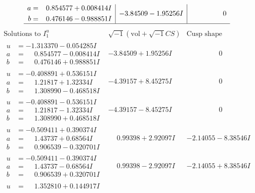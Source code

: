 \documentclass[1p]{elsarticle_modified}
\theoremstyle{definition}
\newcommand{\I}{\sqrt{-1}}
\begin{document}
$$\begin{array}{c|c|c}
\begin{aligned}
a &= \phantom{-}0.854577 + 0.008414 I \\
b &= \phantom{-}0.476146 - 0.988851 I\end{aligned}
 & -3.84509 - 1.95256 I & \phantom{-0.000000 } 0\\
 \hline 
 \end{array}$$\newpage$$\begin{array}{c|c|c}  
\text{Solutions to }I^u_{1}& \I (\text{vol} + \sqrt{-1}CS) & \text{Cusp shape}\\
 \hline 
\begin{aligned}
u &= -1.313370 - 0.054285 I \\
a &= \phantom{-}0.854577 - 0.008414 I \\
b &= \phantom{-}0.476146 + 0.988851 I\end{aligned}
 & -3.84509 + 1.95256 I & \phantom{-0.000000 } 0 \\ \hline\begin{aligned}
u &= -0.408891 + 0.536151 I \\
a &= \phantom{-}1.21817 + 1.32334 I \\
b &= \phantom{-}1.308990 - 0.468518 I\end{aligned}
 & -4.39157 + 8.45275 I & \phantom{-0.000000 } 0 \\ \hline\begin{aligned}
u &= -0.408891 - 0.536151 I \\
a &= \phantom{-}1.21817 - 1.32334 I \\
b &= \phantom{-}1.308990 + 0.468518 I\end{aligned}
 & -4.39157 - 8.45275 I & \phantom{-0.000000 } 0 \\ \hline\begin{aligned}
u &= -0.509411 + 0.390374 I \\
a &= \phantom{-}1.43737 + 0.68564 I \\
b &= \phantom{-}0.906539 - 0.320701 I\end{aligned}
 & \phantom{-}0.99398 + 2.92097 I & -2.14055 - 8.38546 I \\ \hline\begin{aligned}
u &= -0.509411 - 0.390374 I \\
a &= \phantom{-}1.43737 - 0.68564 I \\
b &= \phantom{-}0.906539 + 0.320701 I\end{aligned}
 & \phantom{-}0.99398 - 2.92097 I & -2.14055 + 8.38546 I \\ \hline\begin{aligned}
u &= \phantom{-}1.352810 + 0.144917 I \\

\end{aligned}
\end{array}$$
\end{document}
